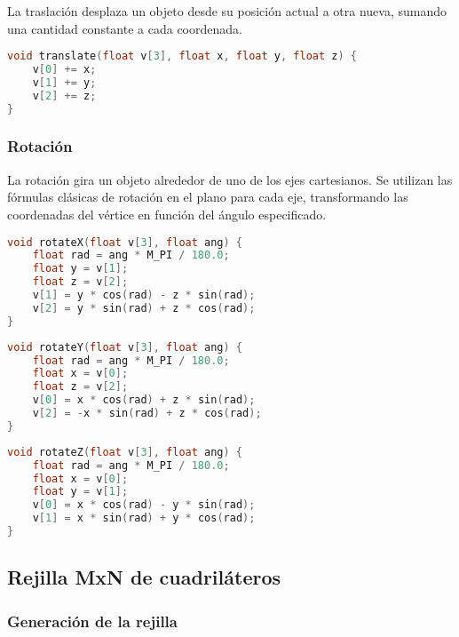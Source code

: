 \documentclass[12pt]{article}
\begin{document}
    La traslación desplaza un objeto desde su posición actual a otra nueva, sumando una cantidad constante a cada coordenada.

    \begin{lstlisting}[language=C, caption={Traslación en 3D}]
void translate(float v[3], float x, float y, float z) {
    v[0] += x;
    v[1] += y;
    v[2] += z;
}
    \end{lstlisting}

    \subsubsection{Rotación}

    La rotación gira un objeto alrededor de uno de los ejes cartesianos. Se utilizan las fórmulas clásicas de rotación en el plano para cada eje, transformando las coordenadas del vértice en función del ángulo especificado.

    \begin{lstlisting}[language=C, caption={Rotación respecto al eje X}]
void rotateX(float v[3], float ang) {
    float rad = ang * M_PI / 180.0;
    float y = v[1];
    float z = v[2];
    v[1] = y * cos(rad) - z * sin(rad);
    v[2] = y * sin(rad) + z * cos(rad);
}
    \end{lstlisting}

    \begin{lstlisting}[language=C, caption={Rotación respecto al eje Y}]
void rotateY(float v[3], float ang) {
    float rad = ang * M_PI / 180.0;
    float x = v[0];
    float z = v[2];
    v[0] = x * cos(rad) + z * sin(rad);
    v[2] = -x * sin(rad) + z * cos(rad);
}
    \end{lstlisting}

    \begin{lstlisting}[language=C, caption={Rotación respecto al eje Z}]
void rotateZ(float v[3], float ang) {
    float rad = ang * M_PI / 180.0;
    float x = v[0];
    float y = v[1];
    v[0] = x * cos(rad) - y * sin(rad);
    v[1] = x * sin(rad) + y * cos(rad);
}
    \end{lstlisting}

    \subsection{Rejilla MxN de cuadriláteros}

    \subsubsection{Generación de la rejilla}
\end{document}
